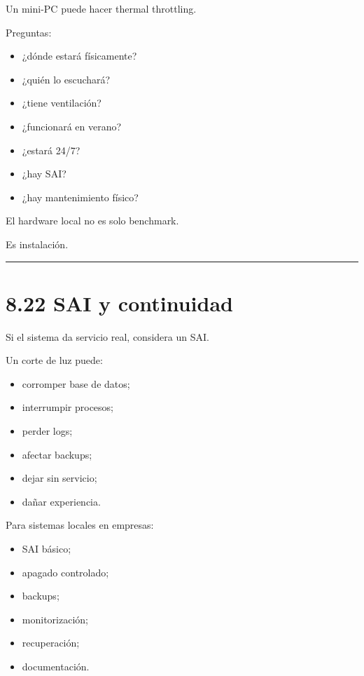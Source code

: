 Un mini-PC puede hacer thermal throttling.

Preguntas:

\begin{itemize}
\tightlist
\item
  ¿dónde estará físicamente?
\item
  ¿quién lo escuchará?
\item
  ¿tiene ventilación?
\item
  ¿funcionará en verano?
\item
  ¿estará 24/7?
\item
  ¿hay SAI?
\item
  ¿hay mantenimiento físico?
\end{itemize}

El hardware local no es solo benchmark.

Es instalación.

\begin{center}\rule{0.5\linewidth}{0.5pt}\end{center}

\section{8.22 SAI y continuidad}\label{sai-y-continuidad}

Si el sistema da servicio real, considera un SAI.

Un corte de luz puede:

\begin{itemize}
\tightlist
\item
  corromper base de datos;
\item
  interrumpir procesos;
\item
  perder logs;
\item
  afectar backups;
\item
  dejar sin servicio;
\item
  dañar experiencia.
\end{itemize}

Para sistemas locales en empresas:

\begin{itemize}
\tightlist
\item
  SAI básico;
\item
  apagado controlado;
\item
  backups;
\item
  monitorización;
\item
  recuperación;
\item
  documentación.
\end{itemize}

